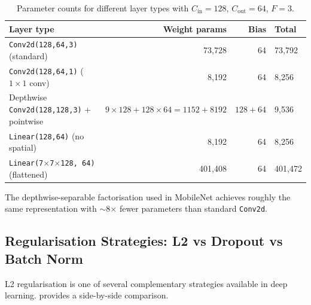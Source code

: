 \documentclass[12pt,a4paper]{article}
\newcommand{\Cin}{C_{\mathrm{in}}}
\newcommand{\Cout}{C_{\mathrm{out}}}
\begin{document}
\begin{table}[ht]
  \centering
  \caption{Parameter counts for different layer types with
    $\Cin=128$, $\Cout=64$, $F=3$.}
  \label{tab:arch_comparison}
  \begin{tabularx}{\linewidth}{@{}Xrrl@{}}
    \toprule
    Layer type & Weight params & Bias & Total \\
    \midrule
    \texttt{Conv2d(128,64,3)} (standard)
      & 73,728 & 64 & 73,792 \\
    \texttt{Conv2d(128,64,1)} ($1\times1$ conv)
      & 8,192  & 64 & 8,256 \\
    Depthwise \texttt{Conv2d(128,128,3)} + pointwise
      & $9\times128 + 128\times64 = 1152+8192$
      & $128+64$ & 9,536 \\
    \texttt{Linear(128,64)} (no spatial)
      & 8,192 & 64 & 8,256 \\
    \texttt{Linear(7$\times$7$\times$128, 64)} (flattened)
      & 401,408 & 64 & 401,472 \\
    \bottomrule
  \end{tabularx}
\end{table}

\noindent
The depthwise-separable factorisation used in MobileNet achieves roughly the
same representation with $\sim$8$\times$ fewer parameters than standard
\texttt{Conv2d}.

\subsection{Regularisation Strategies: L2 vs Dropout vs Batch Norm}

L2 regularisation is one of several complementary strategies available in
deep learning.  provides a side-by-side comparison.
\end{document}

